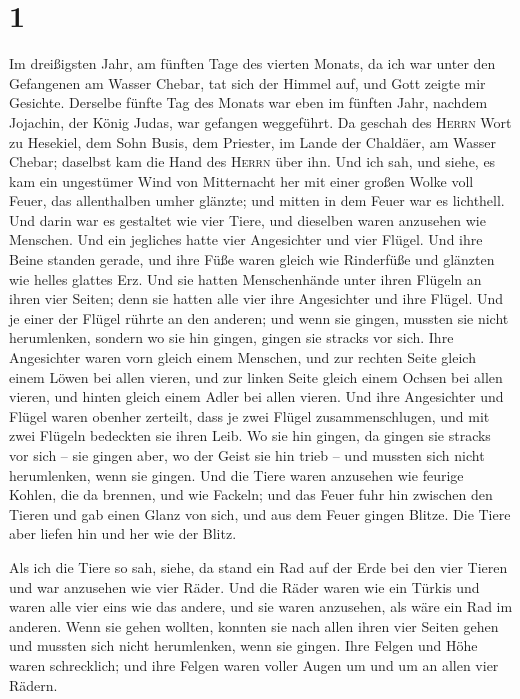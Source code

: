 \hypertarget{section}{%
\section{1}\label{section}}

 Im dreißigsten Jahr, am fünften Tage des vierten Monats,
da ich war unter den Gefangenen am Wasser Chebar, tat sich der Himmel
auf, und Gott zeigte mir Gesichte.  Derselbe fünfte Tag
des Monats war eben im fünften Jahr, nachdem Jojachin, der König Judas,
war gefangen weggeführt.  Da geschah des \textsc{Herrn}
Wort zu Hesekiel, dem Sohn Busis, dem Priester, im Lande der Chaldäer,
am Wasser Chebar; daselbst kam die Hand des \textsc{Herrn} über ihn.
 Und ich sah, und siehe, es kam ein ungestümer Wind von
Mitternacht her mit einer großen Wolke voll Feuer, das allenthalben
umher glänzte; und mitten in dem Feuer war es lichthell. 
Und darin war es gestaltet wie vier Tiere, und dieselben waren anzusehen
wie Menschen.  Und ein jegliches hatte vier Angesichter
und vier Flügel.  Und ihre Beine standen gerade, und ihre
Füße waren gleich wie Rinderfüße und glänzten wie helles glattes Erz.
 Und sie hatten Menschenhände unter ihren Flügeln an ihren
vier Seiten; denn sie hatten alle vier ihre Angesichter und ihre Flügel.
 Und je einer der Flügel rührte an den anderen; und wenn
sie gingen, mussten sie nicht herumlenken, sondern wo sie hin gingen,
gingen sie stracks vor sich.  Ihre Angesichter waren vorn
gleich einem Menschen, und zur rechten Seite gleich einem Löwen bei
allen vieren, und zur linken Seite gleich einem Ochsen bei allen vieren,
und hinten gleich einem Adler bei allen vieren.  Und ihre
Angesichter und Flügel waren obenher zerteilt, dass je zwei Flügel
zusammenschlugen, und mit zwei Flügeln bedeckten sie ihren Leib.
 Wo sie hin gingen, da gingen sie stracks vor sich -- sie
gingen aber, wo der Geist sie hin trieb -- und mussten sich nicht
herumlenken, wenn sie gingen.  Und die Tiere waren
anzusehen wie feurige Kohlen, die da brennen, und wie Fackeln; und das
Feuer fuhr hin zwischen den Tieren und gab einen Glanz von sich, und aus
dem Feuer gingen Blitze.  Die Tiere aber liefen hin und
her wie der Blitz.

 Als ich die Tiere so sah, siehe, da stand ein Rad auf
der Erde bei den vier Tieren und war anzusehen wie vier Räder.
 Und die Räder waren wie ein Türkis und waren alle vier
eins wie das andere, und sie waren anzusehen, als wäre ein Rad im
anderen.  Wenn sie gehen wollten, konnten sie nach allen
ihren vier Seiten gehen und mussten sich nicht herumlenken, wenn sie
gingen.  Ihre Felgen und Höhe waren schrecklich; und ihre
Felgen waren voller Augen um und um an allen vier Rädern.


